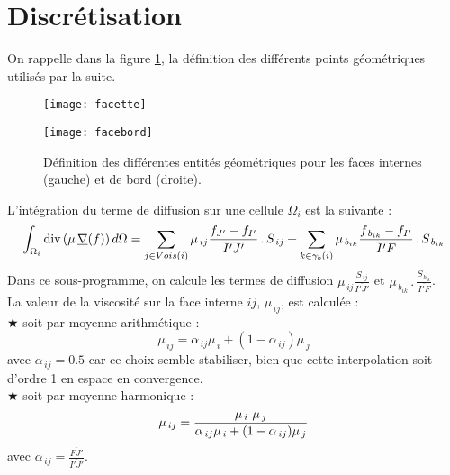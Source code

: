 \section*{Discr\'etisation} \label{Base_Viscfa_paragraphe2}
On rappelle dans la figure \ref{Base_Viscfa_fig_geom}, la définition des différents
points géométriques utilisés par la suite.

\begin{figure}[h]
\parbox{8cm}{%
\centerline{\texttt{[image: facette]}}}
\parbox{8cm}{%
\centerline{\texttt{[image: facebord]}}}
\caption{\label{Base_Viscfa_fig_geom}D\'efinition des diff\'erentes entit\'es
g\'eom\'etriques pour les faces internes (gauche) et de bord (droite).}
\end{figure}

L'intégration du terme de diffusion sur une cellule $\Omega_i$ est la suivante :
\begin{equation}
\int_{\Omega_i}\text{div}\, (\mu\,\underline{\nabla}(f))\,d\Omega= \sum\limits_{j \in
Vois(i)}\mu_{\,ij} \frac{f_{J'}-f_{I'}}{\overline{I'J'}}\,.\, S_{\,ij} + \sum\limits_{k \in
\gamma_b(i)}\mu_{\,b_{ik}} \frac{f_{\,b_{ik}}- f_{I'}}{\overline{I'F}}\,.\,S_{\,b_{ik}}
\end{equation}
Dans ce sous-programme, on calcule les termes de diffusion
$\displaystyle \mu_{\,ij}\frac{S_{\,ij}}{\overline{I'J'}}$ et $\displaystyle
\mu_{\,b_{ik}}\,.\,\frac{S_{\,b_{ik}}}{\overline{I'F}}$.\\

La valeur de la viscosité sur la face interne $ij$, $\mu_{\,ij}$, est calculée :\\
\hspace*{1.cm} {\tiny$\bigstar$}  soit par moyenne arithmétique :
\begin{equation}
\mu_{\,ij}=\alpha_{\,ij}\mu_{\,i}+(1-\alpha_{\,ij})\mu_{\,j}
\end{equation}
avec $\alpha_{\,ij} = 0.5$ car ce choix semble stabiliser, bien que cette
interpolation soit d'ordre 1 en espace en convergence.\\
\hspace*{1.cm} {\tiny$\bigstar$} soit par moyenne harmonique :
\begin{equation}\notag
\mu_{\,ij}=\frac{\mu_{\,i}\ \mu_{\,j}}{\alpha_{\,ij}\mu_{\,i}+(1-\alpha_{\,ij})\mu_{\,j}}
\end{equation}
avec $\alpha_{\,ij}=\displaystyle \frac{\overline{FJ'}}{\overline{I'J'}}$.\\

